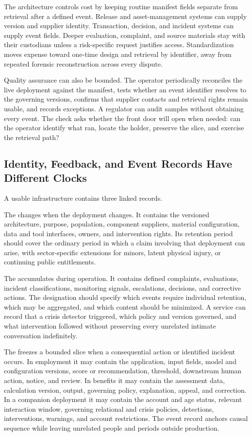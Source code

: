 The architecture controls cost by keeping routine manifest fields separate from retrieval after a defined event. Release and asset-management systems can supply version and supplier identity. Transaction, decision, and incident systems can supply event fields. Deeper evaluation, complaint, and source materials stay with their custodians unless a risk-specific request justifies access. Standardization moves expense toward one-time design and retrieval by identifier, away from repeated forensic reconstruction across every dispute.

Quality assurance can also be bounded. The operator periodically reconciles the live deployment against the manifest, tests whether an event identifier resolves to the governing versions, confirms that supplier contacts and retrieval rights remain usable, and records exceptions. A regulator can audit samples without obtaining every event. The check asks whether the front door will open when needed: can the operator identify what ran, locate the holder, preserve the slice, and exercise the retrieval path?

\subsection{Identity, Feedback, and Event Records Have Different Clocks}

A usable infrastructure contains three linked records.

The  changes when the deployment changes. It contains the versioned architecture, purpose, population, component suppliers, material configuration, data and tool interfaces, owners, and intervention rights. Its retention period should cover the ordinary period in which a claim involving that deployment can arise, with sector-specific extensions for minors, latent physical injury, or continuing public entitlements.

The  accumulates during operation. It contains defined complaints, evaluations, incident classifications, monitoring signals, escalations, decisions, and corrective actions. The designation should specify which events require individual retention, which may be aggregated, and which content should be minimized. A service can record that a crisis detector triggered, which policy and version governed, and what intervention followed without preserving every unrelated intimate conversation indefinitely.

The  freezes a bounded slice when a consequential action or identified incident occurs. In employment it may contain the application, input fields, model and configuration versions, score or recommendation, threshold, downstream human action, notice, and review. In benefits it may contain the assessment data, calculation version, output, governing policy, explanation, appeal, and correction. In a companion deployment it may contain the account and age status, relevant interaction window, governing relational and crisis policies, detections, interventions, warnings, and account restrictions. The event record anchors causal sequence while leaving unrelated people and periods outside production.

